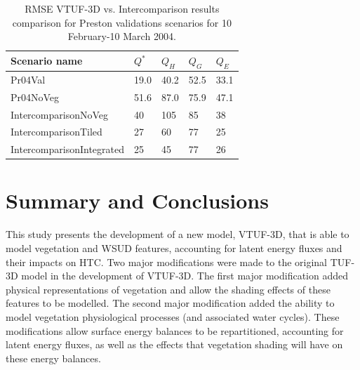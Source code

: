 \documentclass[final,3p,times,authoryear]{elsarticle}
\begin{document}
\begin{center}
\begin{table}[!htbp]
\caption{RMSE VTUF-3D vs. Intercomparison results \citep{Best2012} comparison for Preston validations scenarios for 10 February-10 March 2004.\label{fig:prestonrmse}} 
\begin{tabular}{  | l | l | l|l|l| } 
\hline \textbf{Scenario name} &\textbf{$Q^{*}$}& \textbf{$Q_{H}$}& \textbf{$Q_{G}$}& \textbf{$Q_{E}$}  \\ \hline
Pr04Val & 19.0&	40.2&	52.5&	33.1    \\ \hline
Pr04NoVeg & 51.6&	87.0&	75.9&	47.1  \\ \hline	
IntercomparisonNoVeg & 40&	105&	85&	38   \\ \hline
IntercomparisonTiled &  27&	60&	77&	25  \\ \hline
IntercomparisonIntegrated & 25&	45&	77&	26   \\ \hline
  \end{tabular} 
\end{table}
\end{center} 



\section{Summary and Conclusions}

This study presents the development of a new model, VTUF-3D, that is able to model vegetation and WSUD features, accounting for latent energy fluxes and their impacts on HTC. Two major modifications were made to the original TUF-3D model in the development of VTUF-3D. The first major modification added physical representations of vegetation and allow the shading effects of these features to be modelled. The second major modification added the ability to model vegetation physiological processes (and associated water cycles). These modifications allow surface energy balances to be repartitioned, accounting for latent energy fluxes, as well as the effects that vegetation shading will have on these energy balances.
\end{document}

